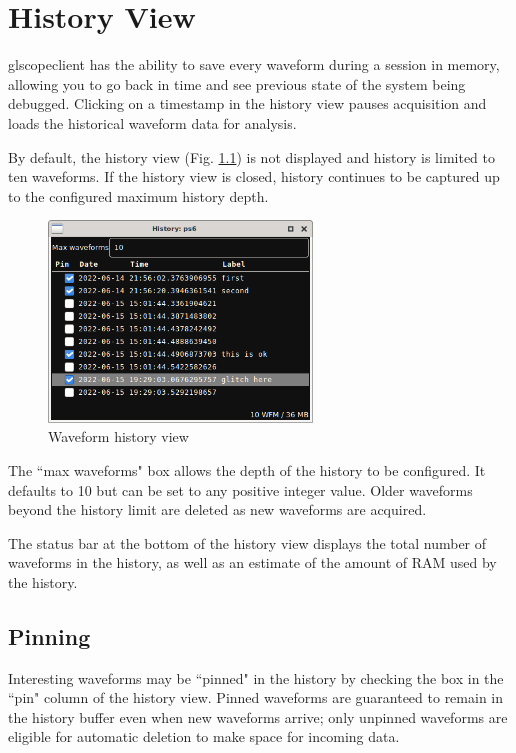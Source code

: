 \chapter{History View}
\label{sec:history}

glscopeclient has the ability to save every waveform during a session in memory, allowing you to go back in time and
see previous state of the system being debugged. Clicking on a timestamp in the history view pauses acquisition and
loads the historical waveform data for analysis.

By default, the history view (Fig. \ref{historyview}) is not displayed and history is limited to ten waveforms. If the
history view is closed, history continues to be captured up to the configured maximum history depth.

\begin{figure}[H]
\centering
\includegraphics[width=7cm]{images/history-view.png}
\caption{Waveform history view}
\label{historyview}
\end{figure}

The ``max waveforms" box allows the depth of the history to be configured. It defaults to 10 but can be set to any
positive integer value. Older waveforms beyond the history limit are deleted as new waveforms are acquired.

The status bar at the bottom of the history view displays the total number of waveforms in the history, as well as an
estimate of the amount of RAM used by the history.

\section{Pinning}

Interesting waveforms may be ``pinned" in the history by checking the box in the ``pin" column of the history view.
Pinned waveforms are guaranteed to remain in the history buffer even when new waveforms arrive; only unpinned waveforms
are eligible for automatic deletion to make space for incoming data.

